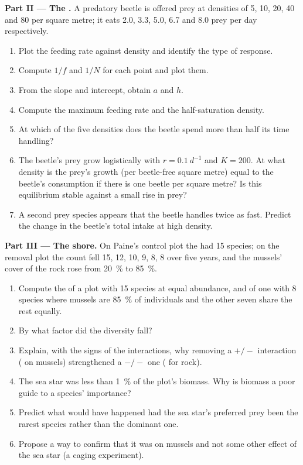 \begin{problem}
\medskip
\noindent\textbf{Part II --- The .}
A predatory beetle is offered prey at densities of 5, 10, 20, 40 and
80 per square metre; it eats 2.0, 3.3, 5.0, 6.7 and 8.0 prey per day
respectively.
\begin{enumerate}[resume]
  \item Plot the feeding rate against density and identify the type of
        response.
  \item Compute $1/f$ and $1/N$ for each point and plot them.
  \item From the slope and intercept, obtain $a$ and $h$.
  \item Compute the maximum feeding rate and the half-saturation
        density.
  \item At which of the five densities does the beetle spend more
        than half its time handling?
  \item The beetle's prey grow logistically with $r = \qty{0.1}{d^{-1}}$
        and $K = 200$. At what density is the prey's growth (per
        beetle-free square metre) equal to the beetle's consumption if
        there is one beetle per square metre? Is this equilibrium
        stable against a small rise in prey?
  \item A second prey species appears that the beetle handles twice as
        fast. Predict the change in the beetle's total intake at high
        density.
\end{enumerate}

\medskip
\noindent\textbf{Part III --- The shore.}
On Paine's control plot the  had 15 species; on the removal
plot the count fell 15, 12, 10, 9, 8, 8 over five years, and the
mussels' cover of the rock rose from \qty{20}{\%} to \qty{85}{\%}.
\begin{enumerate}[resume]
  \item Compute the  of a plot with 15 species at equal
        abundance, and of one with 8 species where mussels are
        \qty{85}{\%} of individuals and the other seven share the rest
        equally.
  \item By what factor did the diversity fall?
  \item Explain, with the signs of the interactions, why removing a
        $+/-$ interaction ( on mussels) strengthened a $-/-$
        one ( for rock).
  \item The sea star was less than \qty{1}{\%} of the plot's biomass.
        Why is biomass a poor guide to a species' importance?
  \item Predict what would have happened had the sea star's preferred
        prey been the rarest species rather than the dominant one.
  \item Propose a way to confirm that it was  on mussels and
        not some other effect of the sea star (a caging experiment).
\end{enumerate}


\end{problem}
